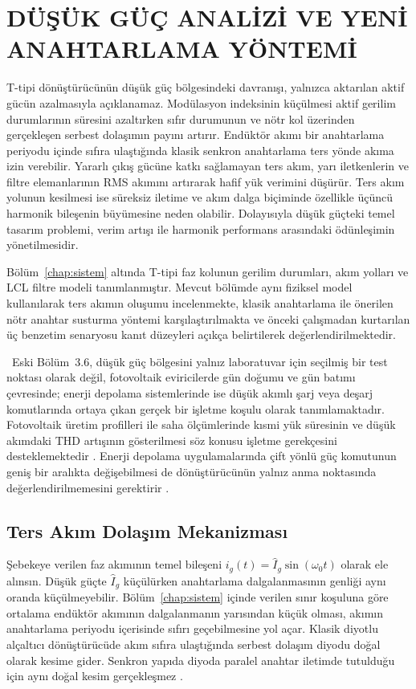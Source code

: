 \chapter{DÜŞÜK GÜÇ ANALİZİ VE YENİ ANAHTARLAMA YÖNTEMİ}
\label{chap:anahtarlama}

T-tipi dönüştürücünün düşük güç bölgesindeki davranışı, yalnızca aktarılan aktif gücün azalmasıyla açıklanamaz. Modülasyon indeksinin küçülmesi aktif gerilim durumlarının süresini azaltırken sıfır durumunun ve nötr kol üzerinden gerçekleşen serbest dolaşımın payını artırır. Endüktör akımı bir anahtarlama periyodu içinde sıfıra ulaştığında klasik senkron anahtarlama ters yönde akıma izin verebilir. Yararlı çıkış gücüne katkı sağlamayan ters akım, yarı iletkenlerin ve filtre elemanlarının RMS akımını artırarak hafif yük verimini düşürür. Ters akım yolunun kesilmesi ise süreksiz iletime ve akım dalga biçiminde özellikle üçüncü harmonik bileşenin büyümesine neden olabilir. Dolayısıyla düşük güçteki temel tasarım problemi, verim artışı ile harmonik performans arasındaki ödünleşimin yönetilmesidir.

Bölüm~\ref{chap:sistem} altında T-tipi faz kolunun gerilim durumları, akım yolları ve LCL filtre modeli tanımlanmıştır. Mevcut bölümde aynı fiziksel model kullanılarak ters akımın oluşumu incelenmekte, klasik anahtarlama ile önerilen nötr anahtar susturma yöntemi karşılaştırılmakta ve önceki çalışmadan kurtarılan üç benzetim senaryosu kanıt düzeyleri açıkça belirtilerek değerlendirilmektedir.

\eskitezetiketi\ Eski Bölüm~3.6, düşük güç bölgesini yalnız laboratuvar için seçilmiş bir test noktası olarak değil, fotovoltaik eviricilerde gün doğumu ve gün batımı çevresinde; enerji depolama sistemlerinde ise düşük akımlı şarj veya deşarj komutlarında ortaya çıkan gerçek bir işletme koşulu olarak tanımlamaktadır. Fotovoltaik üretim profilleri ile saha ölçümlerinde kısmi yük süresinin ve düşük akımdaki THD artışının gösterilmesi söz konusu işletme gerekçesini desteklemektedir \citep{Mondol2007,AbRahman2020,Chicco2009}. Enerji depolama uygulamalarında çift yönlü güç komutunun geniş bir aralıkta değişebilmesi de dönüştürücünün yalnız anma noktasında değerlendirilmemesini gerektirir \citep{Aneke2016}.

\section{Ters Akım Dolaşım Mekanizması}

Şebekeye verilen faz akımının temel bileşeni $i_g(t)=\hat I_g\sin(\omega_0t)$ olarak ele alınsın. Düşük güçte $\hat I_g$ küçülürken anahtarlama dalgalanmasının genliği aynı oranda küçülmeyebilir. Bölüm~\ref{chap:sistem} içinde verilen sınır koşuluna göre ortalama endüktör akımının dalgalanmanın yarısından küçük olması, akımın anahtarlama periyodu içerisinde sıfırı geçebilmesine yol açar. Klasik diyotlu alçaltıcı dönüştürücüde akım sıfıra ulaştığında serbest dolaşım diyodu doğal olarak kesime gider. Senkron yapıda diyoda paralel anahtar iletimde tutulduğu için aynı doğal kesim gerçekleşmez \citep{Erickson2001,Chen2010}.

